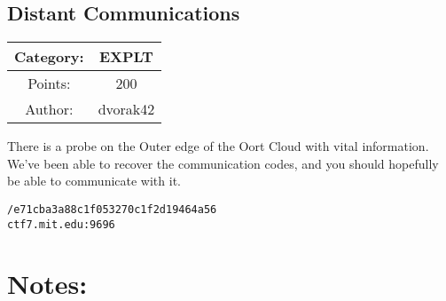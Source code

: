 \begin{center}
\section*{Distant Communications}
{\large
\begin{tabular}{| c c |}
\hline
Category: & EXPLT\\\hline
Points: & 200\\\hline
Author: & dvorak42\\\hline
\end{tabular}
}
\end{center}
\vspace{0.5in}

{\large
There is a probe on the Outer edge of the Oort Cloud with vital information. We've been able to recover the communication codes, and you should hopefully be able to communicate with it.
}
\vspace{0.25in}
\begin{center}
  {\Large\tt /e71cba3a88c1f053270c1f2d19464a56}\\
  {\Large\tt ctf7.mit.edu:9696}
\end{center}

\vspace{0.25in}
\section*{Notes:}
